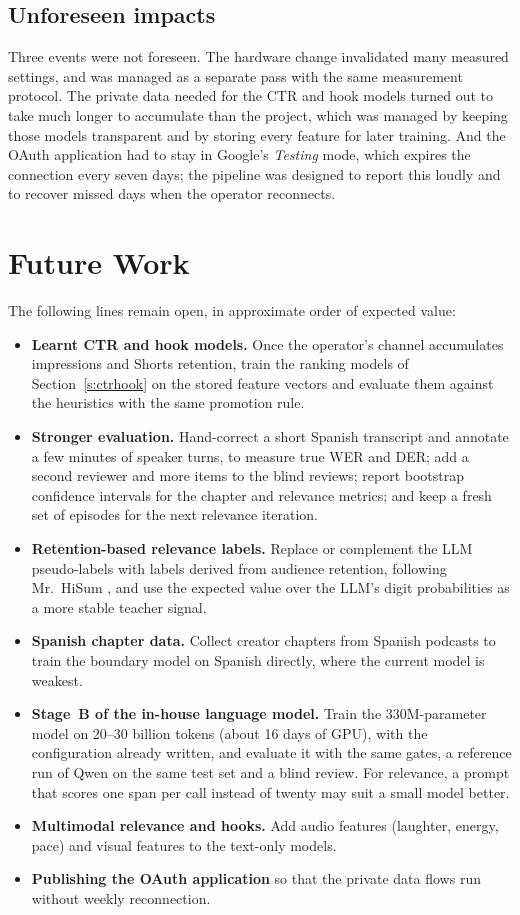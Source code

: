 \subsection*{Unforeseen impacts}

Three events were not foreseen. The hardware change invalidated many measured settings, and was managed as a separate pass with the same measurement protocol. The private data needed for the CTR and hook models turned out to take much longer to accumulate than the project, which was managed by keeping those models transparent and by storing every feature for later training. And the OAuth application had to stay in Google's \textit{Testing} mode, which expires the connection every seven days; the pipeline was designed to report this loudly and to recover missed days when the operator reconnects.

\section{Future Work}

The following lines remain open, in approximate order of expected value:
\begin{itemize}
\item \textbf{Learnt CTR and hook models.} Once the operator's channel accumulates impressions and Shorts retention, train the ranking models of Section~\ref{s:ctrhook} on the stored feature vectors and evaluate them against the heuristics with the same promotion rule.
\item \textbf{Stronger evaluation.} Hand-correct a short Spanish transcript and annotate a few minutes of speaker turns, to measure true WER and DER; add a second reviewer and more items to the blind reviews; report bootstrap confidence intervals for the chapter and relevance metrics; and keep a fresh set of episodes for the next relevance iteration.
\item \textbf{Retention-based relevance labels.} Replace or complement the LLM pseudo-labels with labels derived from audience retention, following Mr.~HiSum \cite{sul2023mrhisum}, and use the expected value over the LLM's digit probabilities as a more stable teacher signal.
\item \textbf{Spanish chapter data.} Collect creator chapters from Spanish podcasts to train the boundary model on Spanish directly, where the current model is weakest.
\item \textbf{Stage~B of the in-house language model.} Train the 330M-parameter model on 20--30 billion tokens (about 16 days of GPU), with the configuration already written, and evaluate it with the same gates, a reference run of Qwen on the same test set and a blind review. For relevance, a prompt that scores one span per call instead of twenty may suit a small model better.
\item \textbf{Multimodal relevance and hooks.} Add audio features (laughter, energy, pace) and visual features to the text-only models.
\item \textbf{Publishing the OAuth application} so that the private data flows run without weekly reconnection.
\end{itemize}
